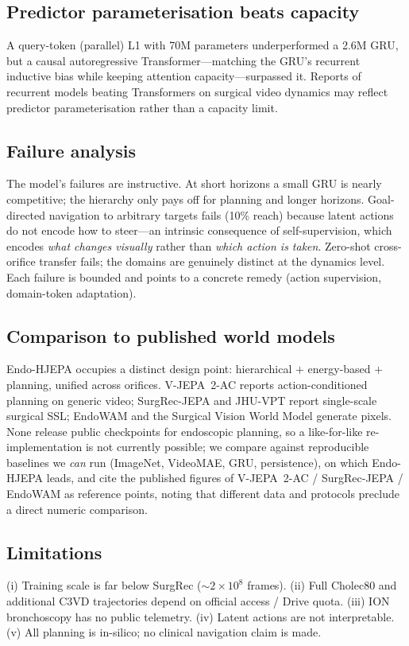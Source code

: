 \documentclass[final,3p,times,twocolumn]{elsarticle}
\begin{document}
\subsection{Predictor parameterisation beats capacity}
A query-token (parallel) L1 with 70M parameters underperformed a 2.6M GRU, but a causal autoregressive Transformer---matching the GRU's recurrent inductive bias while keeping attention capacity---surpassed it. Reports of recurrent models beating Transformers on surgical video dynamics may reflect predictor parameterisation rather than a capacity limit.

\subsection{Failure analysis}
The model's failures are instructive. At short horizons a small GRU is nearly competitive; the hierarchy only pays off for planning and longer horizons. Goal-directed navigation to arbitrary targets fails (10\% reach) because latent actions do not encode how to steer---an intrinsic consequence of self-supervision, which encodes \emph{what changes visually} rather than \emph{which action is taken}. Zero-shot cross-orifice transfer fails; the domains are genuinely distinct at the dynamics level. Each failure is bounded and points to a concrete remedy (action supervision, domain-token adaptation).

\subsection{Comparison to published world models}
Endo-HJEPA occupies a distinct design point: hierarchical $+$ energy-based $+$ planning, unified across orifices. V-JEPA~2-AC reports action-conditioned planning on generic video; SurgRec-JEPA and JHU-VPT report single-scale surgical SSL; EndoWAM and the Surgical Vision World Model generate pixels. None release public checkpoints for endoscopic planning, so a like-for-like re-implementation is not currently possible; we compare against reproducible baselines we \emph{can} run (ImageNet, VideoMAE, GRU, persistence), on which Endo-HJEPA leads, and cite the published figures of V-JEPA~2-AC / SurgRec-JEPA / EndoWAM as reference points, noting that different data and protocols preclude a direct numeric comparison.

\subsection{Limitations}
(i) Training scale is far below SurgRec ($\sim2\times10^8$ frames). (ii) Full Cholec80 and additional C3VD trajectories depend on official access / Drive quota. (iii) ION bronchoscopy has no public telemetry. (iv) Latent actions are not interpretable. (v) All planning is in-silico; no clinical navigation claim is made.
\end{document}
